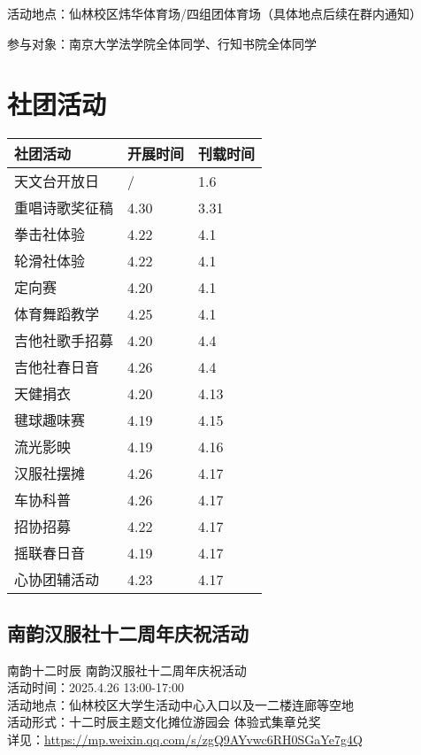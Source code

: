 \documentclass[letterpaper, 12pt]{article}
\begin{document}
\begin{multicols}{2}
活动地点：仙林校区炜华体育场/四组团体育场（具体地点后续在群内通知）

参与对象：南京大学法学院全体同学、行知书院全体同学

\subsection{}
\section{社团活动}
\begin{tabular}{|>{\centering\arraybackslash}m{}|m{}|m{}|}
    \hline
    社团活动 & 开展时间 & 刊载时间\\
    \hline\hline
    天文台开放日 & / & 1.6\\
    重唱诗歌奖征稿 & 4.30 & 3.31\\
    拳击社体验 & 4.22 & 4.1\\
    轮滑社体验 & 4.22 & 4.1\\
    定向赛 & 4.20 & 4.1\\
    体育舞蹈教学 & 4.25 & 4.1\\
    吉他社歌手招募 & 4.20 & 4.4\\
    吉他社春日音 & 4.26 & 4.4\\
    天健捐衣 & 4.20 & 4.13\\
    毽球趣味赛 & 4.19 & 4.15\\
    流光影映 & 4.19 & 4.16\\
    汉服社摆摊 & 4.26 & 4.17\\
    车协科普 & 4.26 & 4.17\\
    招协招募 & 4.22 & 4.17\\
    摇联春日音 & 4.19 & 4.17\\
    心协团辅活动 & 4.23 & 4.17\\
    \hline
\end{tabular}
\subsection{南韵汉服社十二周年庆祝活动}
南韵十二时辰 南韵汉服社十二周年庆祝活动
\\活动时间：2025.4.26 13:00-17:00
\\活动地点：仙林校区大学生活动中心入口以及一二楼连廊等空地
\\活动形式：十二时辰主题文化摊位游园会 体验式集章兑奖
\\详见：\url{https://mp.weixin.qq.com/s/zgQ9AYvwc6RH0SGaYe7g4Q}

\end{multicols}
\end{document}
